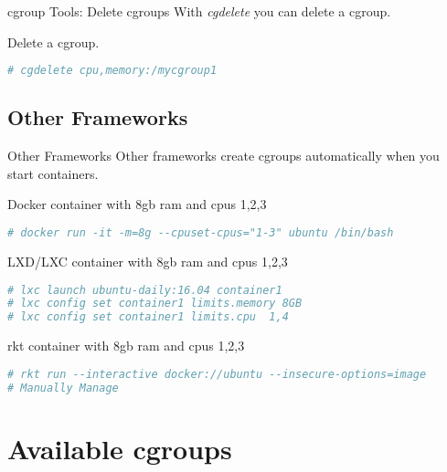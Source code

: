 \documentclass[pdf]{beamer}
\begin{document}
\begin{frame}[fragile]{cgroup Tools: Delete cgroups }
With \textit{cgdelete} you can delete a cgroup.


\begin{block}{Delete a cgroup.}
\begin{lstlisting}[language=bash,keywordstyle=\bf,stringstyle=\it,basicstyle=\tiny]
# cgdelete cpu,memory:/mycgroup1
\end{lstlisting}
\end{block}
\end{frame}

\subsection{Other Frameworks}
\begin{frame}[fragile]{Other Frameworks }
Other frameworks create cgroups automatically when you start containers. 

\begin{block}{Docker container with 8gb ram and cpus 1,2,3}
\begin{lstlisting}[language=bash,keywordstyle=\bf,stringstyle=\it,basicstyle=\tiny]
# docker run -it -m=8g --cpuset-cpus="1-3" ubuntu /bin/bash
\end{lstlisting}
\end{block}
 
\begin{block}{LXD/LXC container with 8gb ram and cpus 1,2,3}
\begin{lstlisting}[language=bash,keywordstyle=\bf,stringstyle=\it,basicstyle=\tiny]
# lxc launch ubuntu-daily:16.04 container1
# lxc config set container1 limits.memory 8GB
# lxc config set container1 limits.cpu  1,4
\end{lstlisting}
\end{block}

\begin{block}{rkt container with 8gb ram and cpus 1,2,3}
\begin{lstlisting}[language=bash,keywordstyle=\bf,stringstyle=\it,basicstyle=\tiny]
# rkt run --interactive docker://ubuntu --insecure-options=image
# Manually Manage
\end{lstlisting}
\end{block}



\end{frame}

\section{Available cgroups}
\end{document}
